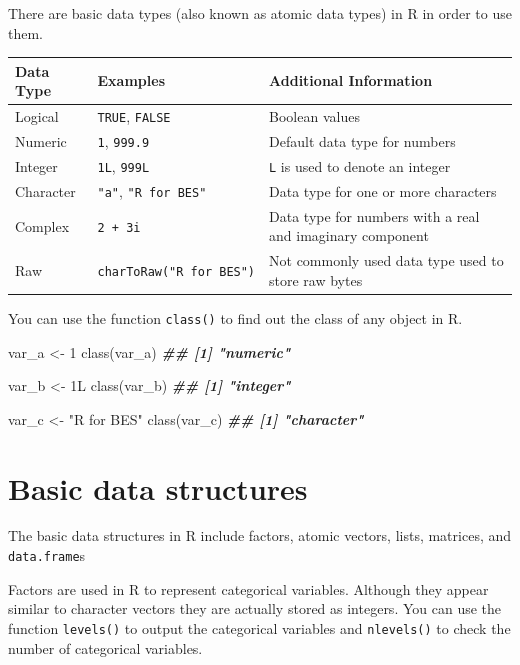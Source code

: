 \documentclass[
]{book}
\newenvironment{Shaded}{\begin{snugshade}}{\end{snugshade}}
\newcommand{\DecValTok}[1]{\textcolor[rgb]{0.00,0.00,0.81}{#1}}
\newcommand{\DocumentationTok}[1]{\textcolor[rgb]{0.56,0.35,0.01}{\textbf{\textit{#1}}}}
\newcommand{\FunctionTok}[1]{\textcolor[rgb]{0.00,0.00,0.00}{#1}}
\newcommand{\NormalTok}[1]{#1}
\newcommand{\OtherTok}[1]{\textcolor[rgb]{0.56,0.35,0.01}{#1}}
\newcommand{\StringTok}[1]{\textcolor[rgb]{0.31,0.60,0.02}{#1}}
\begin{document}
There are basic data types (also known as atomic data types) in R in order to use them.

\begin{longtable}[]{@{}lll@{}}
\toprule
Data Type & Examples & Additional Information \\
\midrule
\endhead
Logical & \texttt{TRUE}, \texttt{FALSE} & Boolean values \\
Numeric & \texttt{1}, \texttt{999.9} & Default data type for numbers \\
Integer & \texttt{1L}, \texttt{999L} & \texttt{L} is used to denote an integer \\
Character & \texttt{"a"}, \texttt{"R\ for\ BES"} & Data type for one or more characters \\
Complex & \texttt{2\ +\ 3i} & Data type for numbers with a real and imaginary component \\
Raw & \texttt{charToRaw("R\ for\ BES")} & Not commonly used data type used to store raw bytes \\
\bottomrule
\end{longtable}

You can use the function \texttt{class()} to find out the class of any object in R.

\begin{Shaded}
\begin{Highlighting}[]
\NormalTok{var\_a }\OtherTok{\textless{}{-}} \DecValTok{1}
\FunctionTok{class}\NormalTok{(var\_a)}
\DocumentationTok{\#\# [1] "numeric"}

\NormalTok{var\_b }\OtherTok{\textless{}{-}}\NormalTok{ 1L}
\FunctionTok{class}\NormalTok{(var\_b)}
\DocumentationTok{\#\# [1] "integer"}

\NormalTok{var\_c }\OtherTok{\textless{}{-}} \StringTok{"R for BES"}
\FunctionTok{class}\NormalTok{(var\_c)}
\DocumentationTok{\#\# [1] "character"}
\end{Highlighting}
\end{Shaded}

\hypertarget{basic-data-structures}{%
\section{Basic data structures}\label{basic-data-structures}}

The basic data structures in R include factors, atomic vectors, lists, matrices, and \texttt{data.frame}s

Factors are used in R to represent categorical variables. Although they appear similar to character vectors they are actually stored as integers. You can use the function \texttt{levels()} to output the categorical variables and \texttt{nlevels()} to check the number of categorical variables.
\end{document}
